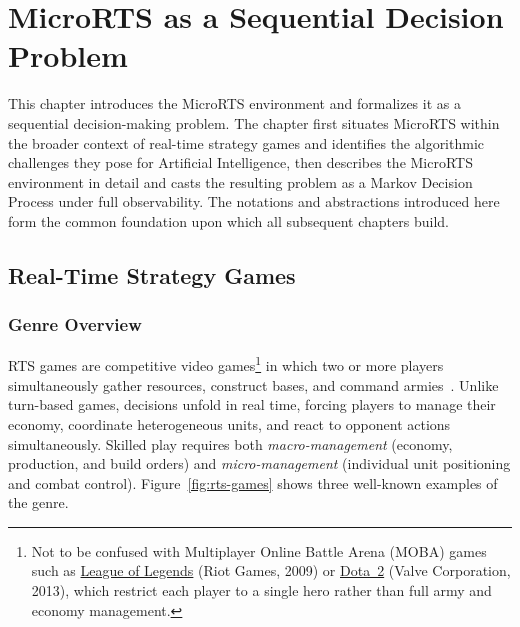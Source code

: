 \chapter{MicroRTS as a Sequential Decision Problem}
\label{chap:background}

This chapter introduces the MicroRTS environment and formalizes it as a sequential decision-making problem. The chapter first situates MicroRTS within the broader context of real-time strategy games and identifies the algorithmic challenges they pose for Artificial Intelligence, then describes the MicroRTS environment in detail and casts the resulting problem as a Markov Decision Process under full observability. The notations and abstractions introduced here form the common foundation upon which all subsequent chapters build.

\section{Real-Time Strategy Games}
\label{sec:rts}

\subsection{Genre Overview}

RTS games are competitive video games\footnote{Not to be confused with Multiplayer Online Battle Arena (MOBA) games such as 
\href{https://www.leagueoflegends.com}{League of Legends} (Riot Games, 2009) or \href{https://www.dota2.com}{Dota~2} (Valve Corporation, 2013), which restrict each player to a single hero rather than full army and economy management.} in which two or more players simultaneously gather resources, construct bases, and command armies~\cite{ontanonSurveyRealTimeStrategy2013}. Unlike turn-based games, decisions unfold in real time, forcing players to manage their economy, coordinate heterogeneous units, and react to opponent actions simultaneously. Skilled play requires both \emph{macro-management} (economy, production, and build orders) and \emph{micro-management} (individual unit positioning and combat control). Figure~\ref{fig:rts-games} shows three well-known examples of the genre.

